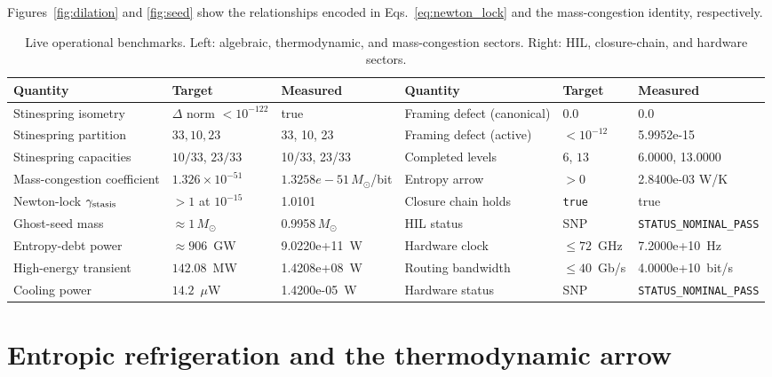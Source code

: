 \documentclass[aps,pra,10pt,onecolumn,superscriptaddress,nofootinbib,longbibliography,floatfix]{revtex4-2}
\newcommand{\ExoticStinespringIsometric}{true}%
\newcommand{\ExoticNLocal}{33}%
\newcommand{\ExoticNActive}{10}%
\newcommand{\ExoticNDark}{23}%
\newcommand{\ExoticEtaA}{10/33}%
\newcommand{\ExoticEtaD}{23/33}%
\newcommand{\ExoticStasisGamma}{1.0101}%
\newcommand{\ExoticAlphaSeed}{1.3258e-51}%
\newcommand{\ExoticGhostMassSun}{0.9958}%
\newcommand{\ExoticEntropyDebtPower}{9.0220e+11}%
\newcommand{\ExoticHighEnergyTransient}{1.4208e+08}%
\newcommand{\ExoticCoolingPower}{1.4200e-05}%
\newcommand{\ExoticFramingDefect}{5.9952e-15}%
\newcommand{\ExoticCanonicalFramingDefect}{0.0}%
\newcommand{\ExoticHilStatus}{\texttt{STATUS\_NOMINAL\_PASS}}%
\newcommand{\ExoticFmaxHz}{7.2000e+10}%
\newcommand{\ExoticRoutingBandwidthBps}{4.0000e+10}%
\newcommand{\ExoticHardwareStatus}{\texttt{STATUS\_NOMINAL\_PASS}}%
\newcommand{\ExoticILStar}{6.0000}%
\newcommand{\ExoticIQStar}{13.0000}%
\newcommand{\ExoticEntropyArrow}{2.8400e-03}%
\newcommand{\ExoticClosureChainHolds}{true}%
\begin{document}
Figures~\ref{fig:dilation} and \ref{fig:seed} show the relationships encoded in Eqs.~\eqref{eq:newton_lock} and the mass-congestion identity, respectively.

\begin{table}[!ht]
\centering
\scriptsize
\setlength{\tabcolsep}{1.5pt}
\caption{Live operational benchmarks.  Left: algebraic, thermodynamic, and mass-congestion sectors.  Right: HIL, closure-chain, and hardware sectors.}
\label{tab:benchmarks}
\begin{tabular}{p{1.9cm}p{2.3cm}p{2.6cm}|p{1.9cm}p{2.3cm}p{2.6cm}}
\hline
Quantity & Target & Measured & Quantity & Target & Measured \\
\hline
Stinespring isometry & $\Delta$ norm $< 10^{-122}$ & \ExoticStinespringIsometric{} & Framing defect (canonical) & $0.0$ & \ExoticCanonicalFramingDefect{} \\
Stinespring partition & $33,10,23$ & \ExoticNLocal{}, \ExoticNActive{}, \ExoticNDark{} & Framing defect (active) & $< 10^{-12}$ & \ExoticFramingDefect{} \\
Stinespring capacities & $10/33$, $23/33$ & \ExoticEtaA{}, \ExoticEtaD{} & Completed levels & $6$, $13$ & \ExoticILStar{}, \ExoticIQStar{} \\
Mass-congestion coefficient & $1.326\times10^{-51}$ & $\ExoticAlphaSeed{} \, M_\odot$/bit & Entropy arrow & $>0$ & \ExoticEntropyArrow{} W/K \\
Newton-lock $\gamma_{\rm stasis}$ & $>1$ at $10^{-15}$ & \ExoticStasisGamma{} & Closure chain holds & \texttt{true} & \ExoticClosureChainHolds{} \\
Ghost-seed mass & $\approx 1\,M_\odot$ & \ExoticGhostMassSun{}\,$M_\odot$ & HIL status & SNP & \ExoticHilStatus{} \\
Entropy-debt power & $\approx 906$~GW & \ExoticEntropyDebtPower{}~W & Hardware clock & $\le 72$~GHz & \ExoticFmaxHz{}~Hz \\
High-energy transient & $142.08$~MW & \ExoticHighEnergyTransient{}~W & Routing bandwidth & $\le 40$~Gb/s & \ExoticRoutingBandwidthBps{}~bit/s \\
Cooling power & $14.2$~$\mu$W & \ExoticCoolingPower{}~W & Hardware status & SNP & \ExoticHardwareStatus{} \\
\hline
\end{tabular}
\end{table}

\FloatBarrier
\section{Entropic refrigeration and the thermodynamic arrow}
\end{document}
